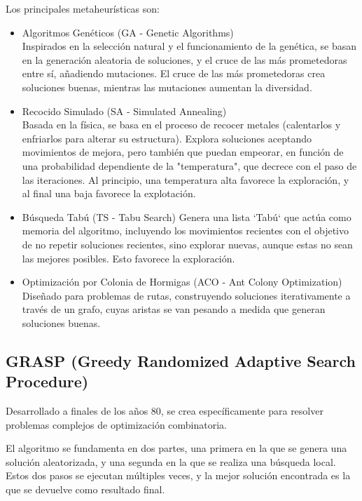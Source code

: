 \documentclass[12pt,a4paper]{book}
\begin{document}
Los principales metaheurísticas son:
\begin{itemize}
    \item Algoritmos Genéticos (GA - Genetic Algorithms)\\
    Inspirados en la selección natural y el funcionamiento de la genética, se basan en la generación aleatoria de soluciones, y el cruce de las más prometedoras entre sí, 
    añadiendo mutaciones. El cruce de las más prometedoras crea soluciones buenas, mientras las mutaciones aumentan la diversidad.
    \item Recocido Simulado (SA - Simulated Annealing)\\
    Basada en la física, se basa en el proceso de recocer metales (calentarlos y enfriarlos para alterar su estructura). Explora soluciones aceptando movimientos de mejora, pero también que puedan empeorar, 
    en función de una probabilidad dependiente de la "temperatura", que decrece con el paso de las iteraciones. Al principio, una temperatura alta favorece la exploración, y al final una baja favorece la explotación.
    \item Búsqueda Tabú (TS - Tabu Search)
    Genera una lista `Tabú` que actúa como memoria del algoritmo, incluyendo los movimientos recientes con el objetivo de no repetir soluciones recientes, sino explorar nuevas, aunque estas no sean las mejores posibles. Esto favorece la exploración.
    \item Optimización por Colonia de Hormigas (ACO - Ant Colony Optimization)
    Diseñado para problemas de rutas, construyendo soluciones iterativamente a través de un grafo, cuyas aristas  se van pesando a medida que generan soluciones buenas.
\end{itemize}


\subsection{GRASP (Greedy Randomized Adaptive Search Procedure)}

Desarrollado a finales de los años 80, se crea específicamente para resolver problemas complejos de optimización combinatoria.

El algoritmo se fundamenta en dos partes, una primera en la que se genera una solución aleatorizada, y una segunda en la que se realiza una búsqueda local.
Estos dos pasos se ejecutan múltiples veces, y la mejor solución encontrada es la que se devuelve como resultado final.
\end{document}
